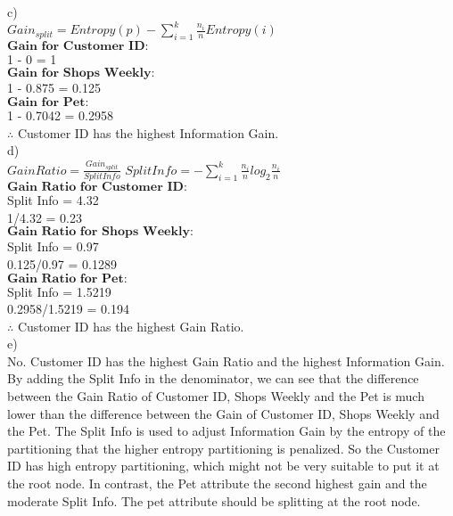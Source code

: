 \documentclass[12pt]{article}
\begin{document}
c)\\

$Gain_{split} = Entropy(p) - \sum_{i=1}^{k}\frac{n_i}{n}Entropy(i)$\\

$\textbf{Gain for Customer ID:}$\\

1 - 0 = 1\\

$\textbf{Gain for Shops Weekly:}$\\

1 - 0.875 = 0.125\\

$\textbf{Gain for Pet:}$\\

1 - 0.7042 = 0.2958\\

$\therefore$ Customer ID has the highest Information Gain.\\

d)\\

$Gain Ratio = \frac{Gain_{split}}{Split Info}$  $Split Info = -\sum_{i=1}^{k}\frac{n_i}{n}log_2\frac{n_i}{n}$\\


$\textbf{Gain Ratio for Customer ID:}$\\

Split Info = 4.32\\

1/4.32 = 0.23\\

$\textbf{Gain Ratio for Shops Weekly:}$\\

Split Info = 0.97\\

0.125/0.97 = 0.1289\\

$\textbf{Gain Ratio for Pet:}$\\

Split Info = 1.5219\\

0.2958/1.5219 = 0.194\\

$\therefore$ Customer ID has the highest Gain Ratio.\\

e)\\

No. Customer ID has the highest Gain Ratio and the highest Information Gain. By adding the Split Info in the denominator, we can see that the difference between the Gain Ratio of Customer ID, Shops Weekly and the Pet is much lower than the difference between the Gain of Customer ID, Shops Weekly and the Pet. The Split Info is used to adjust Information Gain by the entropy of the partitioning that the higher entropy partitioning is penalized. So the Customer ID has high entropy partitioning, which might not be very suitable to put it at the root node. In contrast, the Pet attribute the second highest gain and the moderate Split Info. The pet attribute should be splitting at the root node.\\
\end{document}
